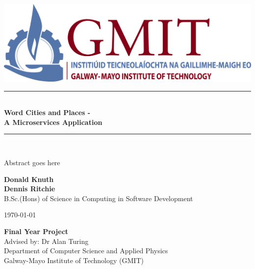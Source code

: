 \documentclass[12pt,a4paper,oneside,openany]{book}
\newcommand{\projecttitle}{ Word Cities and Places - \\ A Microservices Application}
\newcommand{\projectauthor}{Donald Knuth \\[0.2cm] Dennis Ritchie}
\newcommand{\projectadvisor}{Dr Alan Turing}
\newcommand{\projectprogramme}{B.Sc.(Hons) of Science in Computing in Software Development}
\newcommand{\projectabstract}{Abstract goes here}
\newcommand{\projectdate}{\today}
\begin{document}
  \begin{titlepage}
  	 \begin{center}    
  		\includegraphics{img/gmit-logo.jpg}
  	\end{center}
    \begin{minipage}[t][4cm]{\textwidth}
      \centering
      \rule{\linewidth}{0.5mm} \\[0.4cm]
      { \LARGE \bfseries \projecttitle \\[0.4cm] }
      \rule{\linewidth}{0.5mm} \\[0.8cm]
    \end{minipage}
    
      \begin{minipage}[t][5.5cm]{\textwidth}
    	\centering
    	
    	\projectabstract
    \end{minipage}
    
    \begin{minipage}[t][3.5cm]{\textwidth}
      \centering
      \textbf{\projectauthor}\\[0.5cm]
      \projectprogramme
    \end{minipage}
   

  
    \begin{minipage}[t][1cm]{\textwidth}
      \centering
      \textsc{\projectdate}
    \end{minipage}
      
    \begin{minipage}[t][3cm]{\textwidth}
      \centering
      \textbf{Final Year Project}\\[0.3cm]
      Advised by: \projectadvisor \\[0.1cm]
      Department of Computer Science and Applied Physics\\
      Galway-Mayo Institute of Technology (GMIT)
    \end{minipage}
  
   
  \end{titlepage}
   
  \setcounter{page}{2}
  \tableofcontents
  
    
 	
  
  
  
  
  
  
  
\end{document}
